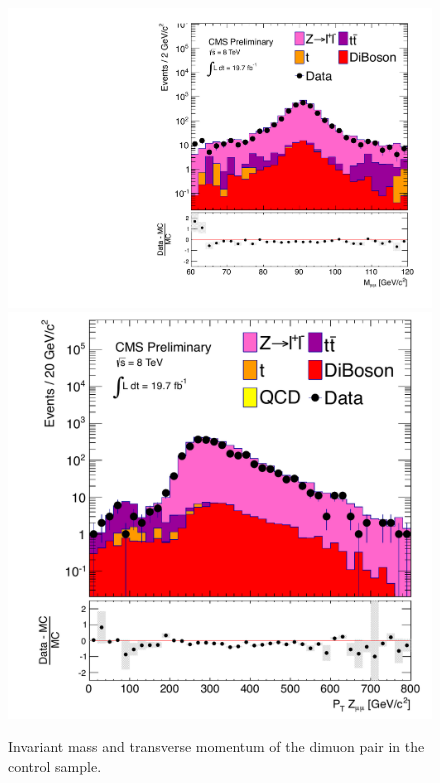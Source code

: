 \begin{figure}[!Hhtb]
  \begin{center}
  \includegraphics[scale=0.39]{Figures/sus13009/cut/ZleplepMT_60_120_prelim.pdf}
  \includegraphics[scale=0.39]{Figures/sus13009/cut/ZleplepPT_60_120_prelim.pdf}
  \caption{Invariant mass and transverse momentum of the dimuon pair in the \zmumu control sample.}
  \label{fig:BKGR_Z_mass}
  \end{center}
\end{figure}

